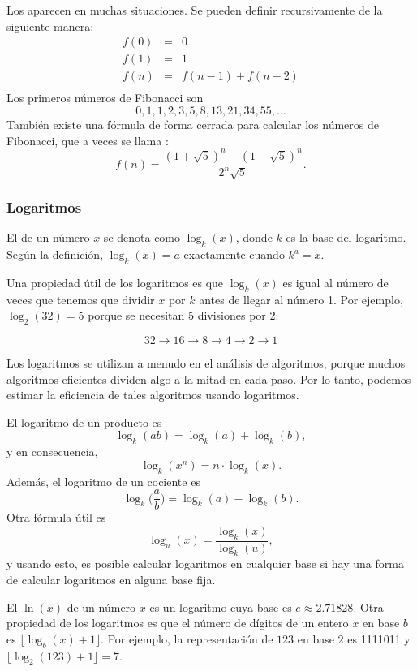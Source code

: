 
Los 
aparecen en muchas situaciones.
Se pueden definir recursivamente de la siguiente manera:
\[
\begin{array}{lcl}
f(0) & = & 0 \\
f(1) & = & 1 \\
f(n) & = & f(n-1)+f(n-2) \\
\end{array}
\]
Los primeros números de Fibonacci son
\[0, 1, 1, 2, 3, 5, 8, 13, 21, 34, 55, \ldots\]
También existe una fórmula de forma cerrada
para calcular los números de Fibonacci, que a veces se llama
 :
\[f(n)=\frac{(1 + \sqrt{5})^n - (1-\sqrt{5})^n}{2^n \sqrt{5}}.\]

\subsubsection{Logaritmos}


El  de un número $x$
se denota como $\log_k(x)$, donde $k$ es la base
del logaritmo.
Según la definición,
$\log_k(x)=a$ exactamente cuando $k^a=x$.

Una propiedad útil de los logaritmos es
que $\log_k(x)$ es igual al número de veces
que tenemos que dividir $x$ por $k$ antes de llegar
al número 1.
Por ejemplo, $\log_2(32)=5$
porque se necesitan 5 divisiones por 2:

\[32 \rightarrow 16 \rightarrow 8 \rightarrow 4 \rightarrow 2 \rightarrow 1 \]

Los logaritmos se utilizan a menudo en el análisis de
algoritmos, porque muchos algoritmos eficientes
dividen algo a la mitad en cada paso.
Por lo tanto, podemos estimar la eficiencia de tales algoritmos
usando logaritmos.

El logaritmo de un producto es
\[\log_k(ab) = \log_k(a)+\log_k(b),\]
y en consecuencia,
\[\log_k(x^n) = n \cdot \log_k(x).\]
Además, el logaritmo de un cociente es
\[\log_k\Big(\frac{a}{b}\Big) = \log_k(a)-\log_k(b).\]
Otra fórmula útil es
\[\log_u(x) = \frac{\log_k(x)}{\log_k(u)},\]
y usando esto, es posible calcular
logaritmos en cualquier base si hay una forma de
calcular logaritmos en alguna base fija.


El  $\ln(x)$ de un número $x$
es un logaritmo cuya base es $e \approx 2.71828$.
Otra propiedad de los logaritmos es que
el número de dígitos de un entero $x$ en base $b$ es
$\lfloor \log_b(x)+1 \rfloor$.
Por ejemplo, la representación de
$123$ en base $2$ es 1111011 y
$\lfloor \log_2(123)+1 \rfloor = 7$.

